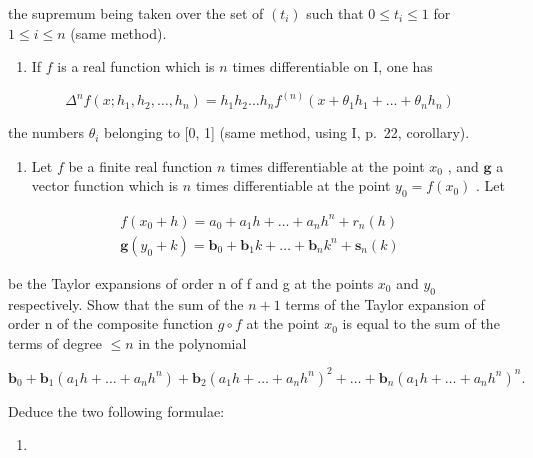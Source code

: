 the supremum being taken over the set of \((t_i)\) such that \(0 \leqslant t_i \leqslant 1\) for \(1 \leqslant i \leqslant n\) (same method).

\begin{enumerate}
\def\labelenumi{\alph{enumi})}
\setcounter{enumi}{2}
\tightlist
\item
  If \(f\) is a real function which is \(n\) times differentiable on I, one has
\end{enumerate}

\[
\Delta^ {n} f (x; h _ {1}, h _ {2}, \dots , h _ {n}) = h _ {1} h _ {2} \dots h _ {n} f ^ {(n)} (x + \theta_ {1} h _ {1} + \dots + \theta_ {n} h _ {n})
\]

the numbers \(\theta_{i}\) belonging to {[}0, 1{]} (same method, using I, p.~22, corollary).

\begin{enumerate}
\def\labelenumi{\arabic{enumi})}
\setcounter{enumi}{6}
\tightlist
\item
  Let \(f\) be a finite real function \(n\) times differentiable at the point \(x_0\) , and \(\mathbf{g}\) a vector function which is \(n\) times differentiable at the point \(y_0 = f(x_0)\) . Let
\end{enumerate}

\[
\begin{array}{l} f (x _ {0} + h) = a _ {0} + a _ {1} h + \dots + a _ {n} h ^ {n} + r _ {n} (h) \\ \mathbf {g} (y _ {0} + k) = \mathbf {b} _ {0} + \mathbf {b} _ {1} k + \dots + \mathbf {b} _ {n} k ^ {n} + \mathbf {s} _ {n} (k) \end{array}
\]

be the Taylor expansions of order n of f and g at the points \(x_{0}\) and \(y_{0}\) respectively. Show that the sum of the \(n+1\) terms of the Taylor expansion of order n of the composite function \(g \circ f\) at the point \(x_{0}\) is equal to the sum of the terms of degree \(\leqslant n\) in the polynomial

\[
\mathbf {b} _ {0} + \mathbf {b} _ {1} (a _ {1} h + \dots + a _ {n} h ^ {n}) + \mathbf {b} _ {2} (a _ {1} h + \dots + a _ {n} h ^ {n}) ^ {2} + \dots + \mathbf {b} _ {n} (a _ {1} h + \dots + a _ {n} h ^ {n}) ^ {n}.
\]

Deduce the two following formulae:

\begin{enumerate}
\def\labelenumi{\alph{enumi})}
\tightlist
\item
\end{enumerate}

